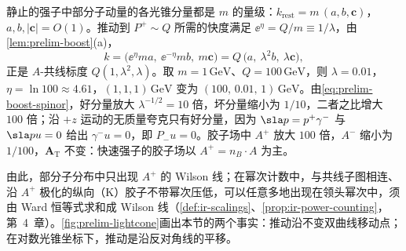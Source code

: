 \begin{example}\label{ex:prelim-boost-scaling}
静止的强子中部分子动量的各光锥分量都是 $m$ 的量级：$k_{\mathrm{rest}}=m\,(a,b,\mathbf c)$，$a,b,|\mathbf c|=O(1)$。推动到 $P^+\sim Q$ 所需的快度满足 $\ee^\eta=Q/m\equiv1/\lambda$，由\cref{lem:prelim-boost}(a)，
\begin{equation}\label{eq:prelim-collinear-scaling}
k=\big(\ee^{\eta}ma,\ \ee^{-\eta}mb,\ m\mathbf c\big)=Q\,\big(a,\ \lambda^2b,\ \lambda\mathbf c\big),
\end{equation}
正是 $A$-共线标度 $Q(1,\lambda^2,\lambda)$。取 $m=1\,\mathrm{GeV}$、$Q=100\,\mathrm{GeV}$，则 $\lambda=0.01$，$\eta=\ln100\approx4.61$，$(1,1,1)\,\mathrm{GeV}$ 变为 $(100,\,0.01,\,1)\,\mathrm{GeV}$。由\cref{eq:prelim-boost-spinor}，好分量放大 $\lambda^{-1/2}=10$ 倍，坏分量缩小为 $1/10$，二者之比增大 $100$ 倍；沿 $+z$ 运动的无质量夸克只有好分量，因为 $\sla p=p^+\gamma^-$ 与 $\sla pu=0$ 给出 $\gamma^-u=0$，即 $P_-u=0$。胶子场中 $A^+$ 放大 $100$ 倍，$A^-$ 缩小为 $1/100$，$\mathbf A_{\mathrm T}$ 不变：快速强子的胶子场以 $A^+=n_B\cdot A$ 为主。
\end{example}

由此，部分子分布中只出现 $A^+$ 的 Wilson 线；在幂次计数中，与共线子图相连、沿 $A^+$ 极化的纵向（K）胶子不带幂次压低，可以任意多地出现在领头幂次中，须由 Ward 恒等式求和成 Wilson 线（\cref{def:ir-scalings}、\cref{prop:ir-power-counting}，第~4~章）。\cref{fig:prelim-lightcone}画出本节的两个事实：推动沿不变双曲线移动点；在对数光锥坐标下，推动是沿反对角线的平移。


